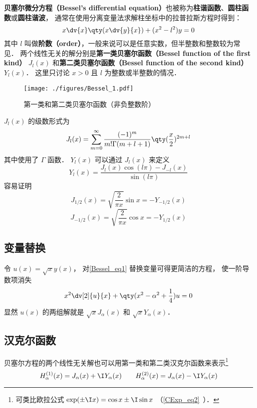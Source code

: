

\textbf{贝塞尔微分方程（Bessel's differential equation）}也被称为\textbf{柱谐函数}、\textbf{圆柱函数}或\textbf{圆柱谐波}， 通常在使用分离变量法求解柱坐标中的拉普拉斯方程时得到：
\begin{equation}\label{Bessel_eq1}
x\dv{x}\qty(x\dv{y}{x}) + (x^2 - l ^2)y = 0
\end{equation}
其中 $l$ 叫做\textbf{阶数（order）}，一般来说可以是任意实数，但半整数和整数较为常见． 两个线性无关的解分别是\textbf{第一类贝塞尔函数（Bessel function of the first kind）} $J_l(x)$ 和\textbf{第二类贝塞尔函数（Bessel function of the second kind）} $Y_l(x)$． 这里只讨论 $x > 0$ 且 $l$ 为整数或半整数的情况．

\begin{figure}[ht]
\centering
\texttt{[image: ./figures/Bessel\_1.pdf]}
\caption{第一类和第二类贝塞尔函数（非负整数阶）} \label{Bessel_fig1}
\end{figure}

$J_l(x)$ 的级数形式为
\begin{equation}
J_l(x) = \sum_{m=0}^\infty \frac{(-1)^m}{m!\Gamma(m+l+1)} \qty(\frac x2)^{2m+l}
\end{equation}
其中使用了 $\Gamma$ 函数． $Y_l(x)$ 可以通过 $J_l(x)$ 来定义
\begin{equation}
Y_l(x) = \frac{J_l(x)\cos(l\pi) - J_{-l}(x)}{\sin(l\pi)}
\end{equation}
容易证明
\begin{equation}
J_{1/2}(x) = \sqrt{\frac{2}{\pi x}} \sin x = -Y_{-1/2}(x)
\end{equation}
\begin{equation}
J_{-1/2}(x) = \sqrt{\frac{2}{\pi x}} \cos x = -Y_{1/2}(x)
\end{equation}

\subsection{变量替换}
令 $u(x) = \sqrt{x} y(x)$， 对\autoref{Bessel_eq1} 替换变量可得更简洁的方程， 使一阶导数项消失
\begin{equation}
x^2\dv[2]{u}{x} + \qty(x^2 - \alpha^2 + \frac{1}{4}) u = 0
\end{equation}
显然 $u(x)$ 的两组解就是 $\sqrt{x}J_\alpha(x)$ 和 $\sqrt{x}Y_\alpha(x)$．

\subsection{汉克尔函数}
贝塞尔方程的两个线性无关解也可以用第一类和第二类汉克尔函数来表示\footnote{可类比欧拉公式 $\exp(\pm\I x) = \cos x \pm \I\sin x$ （\autoref{CExp_eq2}~）．}
\begin{equation}
H_\alpha ^{(1)}(x) = J_\alpha(x) + \I Y_\alpha(x)
\qquad
H_\alpha ^{(2)}(x) = J_\alpha(x) - \I Y_\alpha(x)
\end{equation}

